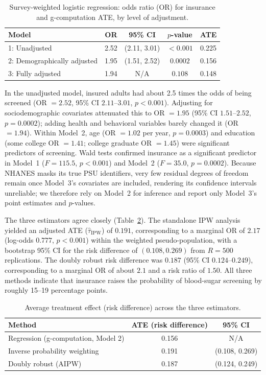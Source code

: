 \documentclass[12pt]{article}
\begin{document}
\begin{table}[h]
\centering
\caption{Survey-weighted logistic regression: odds ratio (OR) for insurance and
g-computation ATE, by level of adjustment.}
\label{tab:regression}
\begin{tabular}{lcccc}
\toprule
\textbf{Model} & \textbf{OR} & \textbf{95\% CI} & \textbf{$p$-value} & \textbf{ATE}\\
\midrule
1: Unadjusted              & 2.52 & (2.11, 3.01) & $<0.001$ & 0.225\\
2: Demographically adjusted & 1.95 & (1.51, 2.52) & $0.0002$ & 0.156\\
3: Fully adjusted          & 1.94 & N/A          & $0.108$  & 0.148\\
\bottomrule
\end{tabular}
\end{table}

In the unadjusted model, insured adults had about 2.5 times the odds of being
screened (OR $= 2.52$, 95\% CI $2.11$--$3.01$, $p < 0.001$). Adjusting for
sociodemographic covariates attenuated this to OR $= 1.95$ (95\% CI
$1.51$--$2.52$, $p = 0.0002$); adding health and behavioral variables barely
changed it (OR $= 1.94$). Within Model~2, age (OR $= 1.02$ per year, $p =
0.0003$) and education (some college OR $= 1.41$; college graduate OR $= 1.45$)
were significant predictors of screening. Wald tests confirmed insurance as a
significant predictor in Model~1 ($F = 115.5$, $p < 0.001$) and Model~2 ($F =
35.0$, $p = 0.0002$). Because NHANES masks its true PSU identifiers, very few
residual degrees of freedom remain once Model~3's covariates are included,
rendering its confidence intervals unreliable; we therefore rely on Model~2 for
inference and report only Model~3's point estimates and $p$-values.

The three estimators agree closely (Table~\ref{tab:methods}). The standalone IPW
analysis yielded an adjusted ATE ($\hat{\tau}_{\mathrm{IPW}}$) of $0.191$,
corresponding to a marginal OR of $2.17$ (log-odds $0.777$, $p < 0.001$) within
the weighted pseudo-population, with a bootstrap 95\% CI for the risk difference
of $(0.108, 0.269)$ from $R = 500$ replications. The doubly robust risk
difference was $0.187$ (95\% CI $0.124$--$0.249$), corresponding to a marginal OR
of about $2.1$ and a risk ratio of $1.50$. All three methods indicate that
insurance raises the probability of blood-sugar screening by roughly 15--19
percentage points.

\begin{table}[h]
\centering
\caption{Average treatment effect (risk difference) across the three estimators.}
\label{tab:methods}
\begin{tabular}{lcc}
\toprule
\textbf{Method} & \textbf{ATE (risk difference)} & \textbf{95\% CI}\\
\midrule
Regression (g-computation, Model 2) & 0.156 & N/A\\
Inverse probability weighting       & 0.191 & (0.108, 0.269)\\
Doubly robust (AIPW)                & 0.187 & (0.124, 0.249)\\
\bottomrule
\end{tabular}
\end{table}
\end{document}
